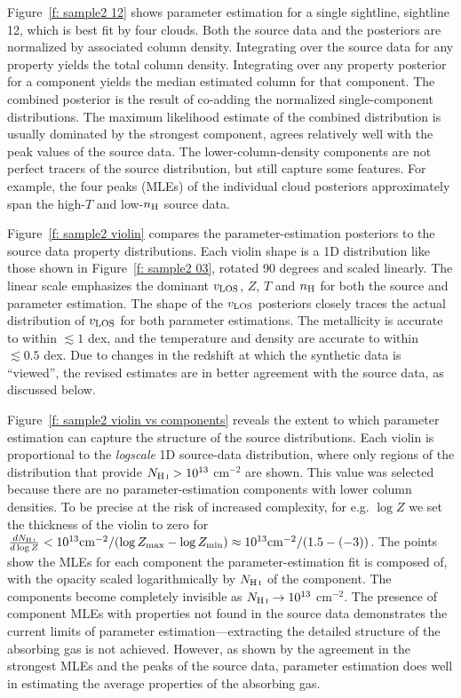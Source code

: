 \documentclass[fleqn,usenatbib]{mnras}
\begin{document}
Figure~\ref{f: sample2 12} shows parameter estimation for a single sightline, sightline 12, which is best fit by four clouds.
Both the source data and the posteriors are normalized by associated  column density.
Integrating over the source data for any property yields the total  column density.
Integrating over any property posterior for a component yields the median estimated  column for that component.
The combined posterior is the result of co-adding the normalized single-component distributions.
The maximum likelihood estimate of the combined distribution is usually dominated by the strongest component,
agrees relatively well with the peak values of the source data.
The lower-column-density components are not perfect tracers of the source distribution, but still capture some features.
For example, the four peaks (MLEs) of the individual cloud posteriors approximately span the high-$T$ and low-$n_{\rm H}$ source data.

Figure~\ref{f: sample2 violin} compares the parameter-estimation posteriors to the source data property distributions.
Each violin shape is a 1D distribution like those shown in Figure~\ref{f: sample2 03}, rotated 90 degrees and scaled linearly.
The linear scale emphasizes the dominant $v_{\rm LOS}$, $Z$, $T$ and $n_{\rm H}$ for both the source and parameter estimation.
The shape of the $v_{\rm LOS}$ posteriors closely traces the actual distribution of $v_{\rm LOS}$ for both parameter estimations.
The metallicity is accurate to within $\lesssim 1$ dex,
and the temperature and density are accurate to within $\lesssim 0.5$ dex.
Due to changes in the redshift at which the synthetic data is ``viewed'', the revised estimates are in better agreement with the source data,
as discussed below.

Figure~\ref{f: sample2 violin vs components} reveals the extent to which parameter estimation can capture the structure of the source distributions.
Each violin is proportional to the \textit{logscale} 1D source-data distribution,
where only regions of the distribution that provide $N_{\ion{H}{I}} > 10^{13}$ cm$^{-2}$ are shown.
This value was selected because there are no parameter-estimation components with lower column densities.
To be precise at the risk of increased complexity,
for e.g. $\log Z$ we set the thickness of the violin to zero for $\frac{dN_{\ion{H}{I}}}{d\log Z} < 10^{13} {\rm cm}^{-2} / (\log Z_{\rm max} - \log Z_{\rm min} ) \approx 10^{13} {\rm cm}^{-2} / ( 1.5 - (-3) )$.
The points show the MLEs for each component the parameter-estimation fit is composed of,
with the opacity scaled logarithmically by $N_{\ion{H}{I}}$ of the component.
The components become completely invisible as $N_{\ion{H}{I}} \rightarrow 10^{13}$ cm$^{-2}$.
The presence of component MLEs with properties not found in the source data demonstrates the current limits of parameter estimation---extracting the detailed structure of the absorbing gas is not achieved.
However, as shown by the agreement in the strongest MLEs and the peaks of the source data,
parameter estimation does well in estimating the average properties of the absorbing gas.
\end{document}
